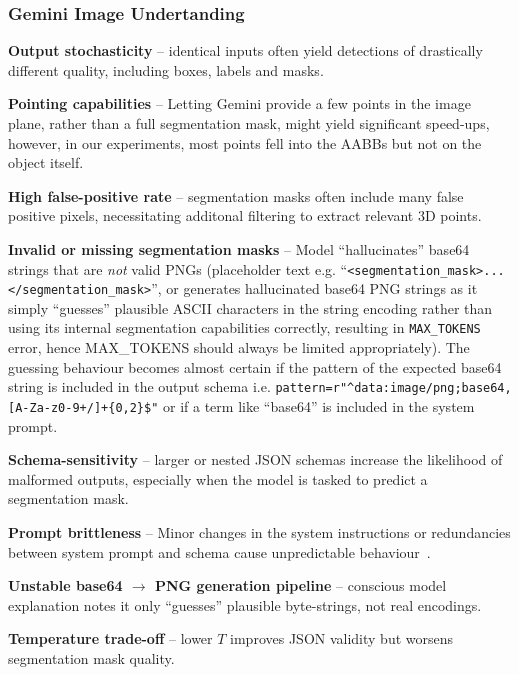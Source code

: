 \subsubsection{Gemini Image Undertanding}
\begin{description}
    \item \textbf{Output stochasticity} -- identical inputs often yield detections of drastically different quality, including boxes, labels and masks.
    \item \textbf{Pointing capabilities} -- Letting Gemini provide a few points in the image plane, rather than a full segmentation mask, might yield significant speed-ups, however, in our experiments, most points fell into the AABBs but not on the object itself. %
    \item \textbf{High false-positive rate} -- segmentation masks often include many false positive pixels, necessitating additonal filtering to extract relevant 3D points.
    \item \textbf{Invalid or missing segmentation masks} -- Model ``hallucinates'' base64 strings that are \emph{not} valid PNGs (placeholder text e.g. ``\texttt{<segmentation\_mask>...</segmentation\_mask>}'', or generates hallucinated base64 PNG strings as it simply ``guesses'' plausible ASCII characters in the string encoding rather than using its internal segmentation capabilities correctly, resulting in \texttt{MAX\_TOKENS} error, hence MAX\_TOKENS should always be limited appropriately). The guessing behaviour becomes almost certain if the pattern of the expected base64 string is included in the output schema i.e. \texttt{pattern=r"\textasciicircum data:image/png;base64,[A-Za-z0-9+/]+\{0,2\}\$"} or if a term like ``base64'' is included in the system prompt.
    \item \textbf{Schema-sensitivity} -- larger or nested JSON schemas increase the likelihood of malformed outputs, especially when the model is tasked to predict a segmentation mask.
    \item \textbf{Prompt brittleness} -- Minor changes in the system instructions or redundancies between system prompt and schema cause unpredictable behaviour~\cite{googleStructuredOutput2025}.
    \item \textbf{Unstable base64 \( \rightarrow \) PNG generation pipeline} -- conscious model explanation notes it only ``guesses'' plausible byte-strings, not real encodings.
    \item \textbf{Temperature trade-off} -- lower \(T\) improves JSON validity but worsens segmentation mask quality.
\end{description}


